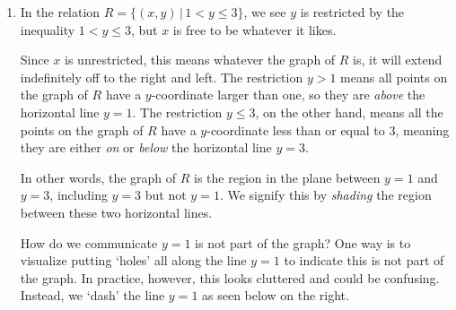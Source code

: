 \documentclass{ximera}
\begin{document}
\begin{example}
\begin{enumerate}
\begin{enumerate}
\item  In the relation $R = \{ (x,y) \, | \, 1 < y \leq 3 \}$, we see $y$ is restricted by the inequality $1 < y \leq 3$, but  $x$ is free to be whatever it likes.   

\smallskip

Since $x$ is unrestricted, this means whatever the graph of $R$ is, it will extend indefinitely off to the right and left.  The restriction $y > 1$ means all points on the graph of $R$ have a $y$-coordinate larger than one, so they are \textit{above} the horizontal line $y =1$.  The restriction $y \leq 3$, on the other hand,  means all the points on the graph of $R$ have a $y$-coordinate less than or equal to $3$, meaning they are either \textit{on} or \textit{below} the horizontal line $y = 3$.   

\smallskip

In other words, the graph of $R$ is the region in the plane between $y=1$ and $y=3$, including $y=3$ but not $y = 1$.  We signify this by \textit{shading} the region between these two horizontal lines.  

\smallskip

How do we communicate $y=1$ is not part of the graph?  One way is to visualize putting `holes' all along the line $y=1$ to indicate this is not part of the graph.  In practice, however, this looks cluttered and could be confusing.  Instead, we  `dash' the line $y = 1$ as seen below on the right. 


\begin{multicols}{2}


% 



% 




\end{multicols}
\end{enumerate}
\end{enumerate}
\end{example}
\end{document}
